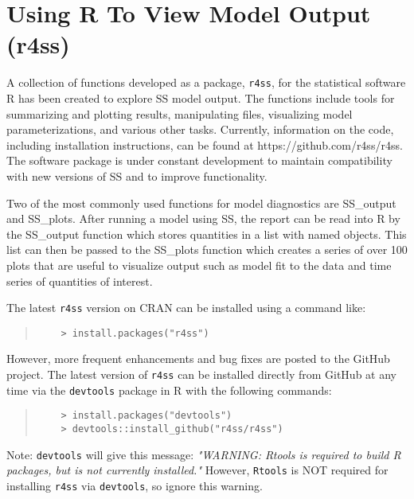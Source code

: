 \section{Using R To View Model Output (r4ss)}\label{r4ss}

A collection of functions developed as a package, \texttt{r4ss}, for the statistical software R has been created to explore SS model output.  The functions include tools for summarizing and plotting results, manipulating files, visualizing model parameterizations, and various other tasks.  Currently, information on the code, including installation instructions, can be found at https://github.com/r4ss/r4ss.  The software package is under constant development to maintain compatibility with new versions of SS and to improve functionality.

Two of the most commonly used functions for model diagnostics are SS\_output and SS\_plots.  After running a model using SS, the report can be read into R by the SS\_output function which stores quantities in a list with named objects.  This list can then be passed to the SS\_plots function which creates a series of over 100 plots that are useful to visualize output such as model fit to the data and time series of quantities of interest.

The latest \texttt{r4ss} version on CRAN can be installed using a command like:

\begin{quote}
	\begin{verbatim}
	> install.packages("r4ss")
	\end{verbatim}
\end{quote}


However, more frequent enhancements and bug fixes are posted to the GitHub project.  The latest version of \texttt{r4ss} can be installed directly from GitHub at any time via the \texttt{devtools} package in R with the following commands:

\begin{quote}
	\begin{verbatim}
	> install.packages("devtools")
	> devtools::install_github("r4ss/r4ss")
	\end{verbatim}
\end{quote}

Note: \texttt{devtools} will give this message: \textit{"WARNING: Rtools is required to build R packages, but is not currently installed."} However, \texttt{Rtools} is NOT required for installing \texttt{r4ss} via \texttt{devtools}, so ignore this warning.

